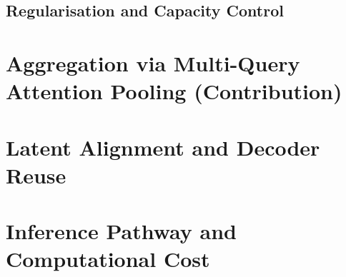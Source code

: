 \subsection{Regularisation and Capacity Control}
\section{Aggregation via Multi-Query Attention Pooling (Contribution)}
\section{Latent Alignment and Decoder Reuse}
\section{Inference Pathway and Computational Cost}